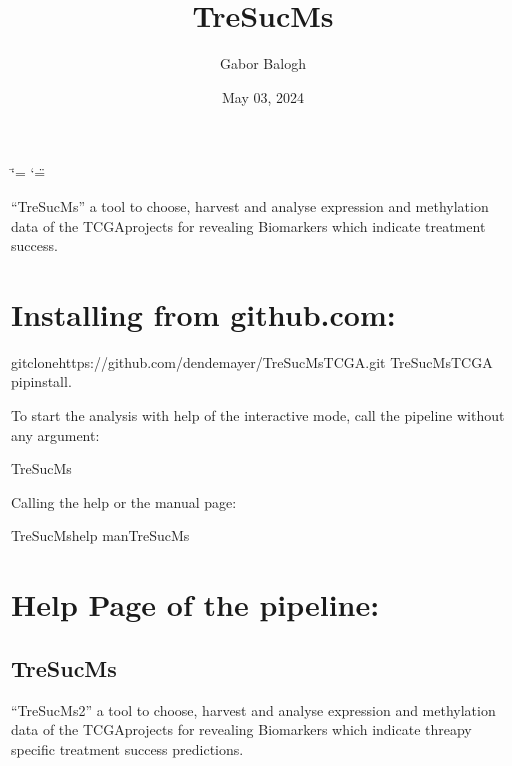 \documentclass[letterpaper,10pt,english]{sphinxmanual}
\title{TreSucMs}
\date{May 03, 2024}
\author{Gabor Balogh}
\begin{document}
\ifdefined\shorthandoff
  \ifnum\catcode`\=\string=\active\shorthandoff{=}\fi
  \ifnum\catcode`\"=\active{}\fi
\fi

\pagestyle{empty}
\sphinxmaketitle
\pagestyle{plain}
\sphinxtableofcontents
\pagestyle{normal}
\label{\detokenize{index::doc}}


\sphinxAtStartPar
“TreSucMs” a tool to choose, harvest and analyse expression and methylation data
of the TCGA\sphinxhyphen{}projects for revealing Biomarkers which indicate treatment success.


\chapter{Installing from github.com:}
\label{\detokenize{index:installing-from-github-com}}
\begin{sphinxVerbatim}[commandchars=\\\{\}]
\PYGZdl{}gitclonehttps://github.com/dendemayer/TreSucMs\PYGZhy{}TCGA.git
\PYGZdl{}TreSucMs\PYGZhy{}TCGA
\PYGZdl{}pipinstall.
\end{sphinxVerbatim}

\sphinxAtStartPar
To start the analysis with help of the interactive mode, call the pipeline
without any argument:

\begin{sphinxVerbatim}[commandchars=\\\{\}]
\PYGZdl{}TreSucMs
\end{sphinxVerbatim}

\sphinxAtStartPar
Calling the help or the manual page:

\begin{sphinxVerbatim}[commandchars=\\\{\}]
\PYGZdl{}TreSucMs\PYGZhy{}\PYGZhy{}help
\PYGZdl{}manTreSucMs
\end{sphinxVerbatim}


\chapter{Help Page of the pipeline:}
\label{\detokenize{index:help-page-of-the-pipeline}}

\section{TreSucMs}
\label{\detokenize{index:tresucms}}
\sphinxAtStartPar
“TreSucMs2” a tool to choose, harvest and analyse expression and methylation data
of the TCGA\sphinxhyphen{}projects for revealing Biomarkers which indicate threapy
specific treatment success predictions.
\end{document}
